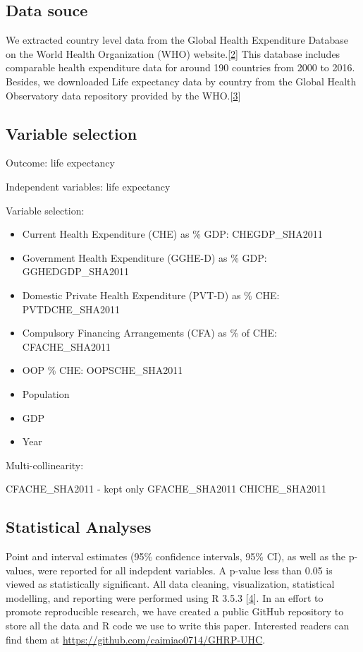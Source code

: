 \documentclass[]{elsarticle} %
\providecommand{\tightlist}{%
  \setlength{\itemsep}{0pt}\setlength{\parskip}{0pt}}
\begin{document}
\hypertarget{data-souce}{%
\subsection{Data souce}\label{data-souce}}

We extracted country level data from the Global Health Expenditure Database on the World Health Organization (WHO) website.{[}\protect\hyperlink{ref-WHOdata}{2}{]} This database includes comparable health expenditure data for around 190 countries from 2000 to 2016. Besides, we downloaded Life expectancy data by country from the Global Health Observatory data repository provided by the WHO.{[}\protect\hyperlink{ref-WHOlife}{3}{]}

\hypertarget{variable-selection}{%
\subsection{Variable selection}\label{variable-selection}}

Outcome: life expectancy

Independent variables: life expectancy

Variable selection:

\begin{itemize}
\tightlist
\item
  Current Health Expenditure (CHE) as \% GDP: CHEGDP\_SHA2011
\item
  Government Health Expenditure (GGHE-D) as \% GDP: GGHEDGDP\_SHA2011
\item
  Domestic Private Health Expenditure (PVT-D) as \% CHE: PVTDCHE\_SHA2011
\item
  Compulsory Financing Arrangements (CFA) as \% of CHE: CFACHE\_SHA2011
\item
  OOP \% CHE: OOPSCHE\_SHA2011
\item
  Population
\item
  GDP
\item
  Year
\end{itemize}

Multi-collinearity:

CFACHE\_SHA2011 - kept only
GFACHE\_SHA2011
CHICHE\_SHA2011

\hypertarget{statistical-analyses}{%
\subsection{Statistical Analyses}\label{statistical-analyses}}

Point and interval estimates (95\% confidence intervals, 95\% CI), as well as the p-values, were reported for all indepdent variables. A p-value less than 0.05 is viewed as statistically significant. All data cleaning, visualization, statistical modelling, and reporting were performed using R 3.5.3 {[}\protect\hyperlink{ref-R353}{4}{]}. In an effort to promote reproducible research, we have created a public GitHub repository to store all the data and R code we use to write this paper.
Interested readers can find them at \url{https://github.com/caimiao0714/GHRP-UHC}.
\end{document}

